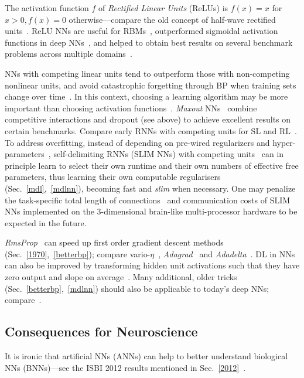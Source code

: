 \documentclass[letterpaper]{article}
\begin{document}
\begin{sloppypar}
The activation function $f$ of {\em Rectified Linear Units} (ReLUs)  is
$f(x) =  x$ for $x > 0, f(x)=0$ otherwise---compare the old concept of half-wave rectified units~\citep{malik1990}.
ReLU NNs are useful for RBMs~\citep{Nair2010,Maas2013}, outperformed sigmoidal activation
functions in deep NNs~\citep{Glorot2011a}, and helped to obtain  best results on several benchmark 
problems across multiple domains~\citep[e.g.,][]{Krizhevsky:2012,Dahl2013}.



NNs with competing linear units tend to outperform those with non-competing nonlinear
units, and avoid catastrophic forgetting through BP 
when training sets change over time~\citep{srivastava2013compete}. In this context,
choosing a learning algorithm may be more important than choosing activation functions~\citep{Goodfellow2014}.
{\em Maxout} NNs~\citep{goodfellow2013maxout} combine
competitive interactions and 
dropout (see above) to achieve excellent results on certain
benchmarks.
Compare early RNNs with competing units for SL and RL~\citep{Schmidhuber:89cs}.
To address overfitting, instead of depending on  pre-wired regularizers and hyper-parameters~\citep{Hertz:91,bishop:2006},
self-delimiting RNNs (SLIM NNs) with competing units~\citep{Schmidhuber:12slimnn}
can in principle learn to select their own runtime and their own numbers of effective free parameters,
thus learning their own computable regularisers (Sec.~\ref{mdl},~\ref{mdlnn}), 
 becoming fast and  {\em slim} when necessary.
One may  penalize the task-specific  total length of connections~\citep[e.g.,][]{maass2002wire,Schmidhuber:12slimnn,Schmidhuber:13powerplay,clune2013modular} 
and communication costs of 
SLIM NNs implemented on the 3-dimensional brain-like multi-processor 
hardware to be expected in the future.


{\em RmsProp}~\citep{Tieleman2012,Schaul2012} can speed up first order gradient descent methods (Sec.~\ref{1970},~\ref{betterbp}); 
compare vario-$\eta$~\citep{DBLP:conf/nips/NeuneierZ96},
{\em Adagrad}~\citep{Duchi2011} and {\em Adadelta}~\citep{zeiler2012}.
DL in NNs can also be improved
by transforming hidden unit activations such that they have zero output and slope on average~\citep{raiko2012}.
Many additional, older tricks (Sec.~\ref{betterbp},~\ref{mdlnn}) should also be applicable to today's deep NNs;
compare~\citep{orr1998neural,tricksofthetrade:2012}.




\subsection{Consequences for Neuroscience}
\label{bnn}
It is ironic that artificial NNs (ANNs) can help to better understand biological NNs (BNNs)---see the ISBI 2012 results 
mentioned in Sec.~\ref{2012}~\citep{isbi12,ciresan2012nips}.


\end{sloppypar}
\end{document}
